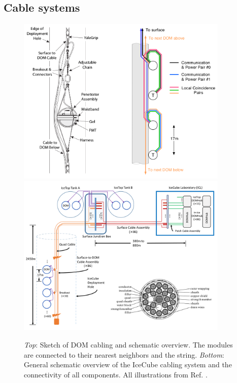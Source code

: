 \subsection{Cable systems}
\label{subsec:cablesystems}
\begin{figure}
\centering
\includegraphics[width=0.9\textwidth]{chapter5/img/cablelayout.png}
\includegraphics[width=0.9\textwidth]{chapter5/img/cableSchematic_withcable.png}
\caption{\textit{Top}: Sketch of DOM cabling and schematic overview. The modules are connected to their nearest neighbors and the string. \textit{Bottom}: General schematic overview of the IceCube cabling system and the connectivity of all components. All illustrations from Ref. \cite{Aartsen:2016nxy}.}
\label{fig:cable}
\end{figure}

